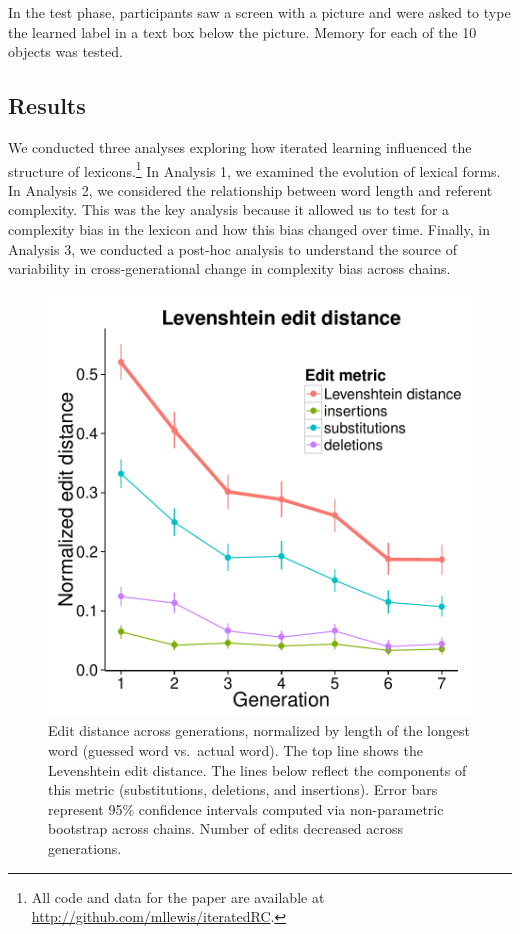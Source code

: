 In the test phase, participants saw a screen with a picture and were asked to type the learned label in a text box below the picture. Memory for each of the 10 objects was tested.

\subsection{Results}



We conducted three analyses exploring how iterated learning influenced the structure of lexicons.\footnote{All code and data for the paper are available at \url{http://github.com/mllewis/iteratedRC}.} In Analysis 1, we examined the evolution of lexical forms. In Analysis  2, we considered the relationship between word length and referent complexity. This was the key analysis because it allowed us to test for a complexity bias in the lexicon and how this bias changed over time. Finally, in Analysis  3, we conducted a post-hoc analysis to understand the source of variability in cross-generational change in complexity bias across chains.

\begin{figure}[t]
\begin{center}
\includegraphics[width = .7\linewidth]{figs/lev.pdf}
\end{center}
\vspace{-.5em}
\caption{Edit distance across generations, normalized by length of the longest word (guessed word vs.\ actual word). The top line shows the Levenshtein edit distance. The lines below reflect the components of this metric (substitutions, deletions, and insertions). Error bars represent 95\% confidence intervals computed via non-parametric bootstrap across chains. Number of edits decreased across generations.}
\label{fig:lev}
\vspace{-1em}
\end{figure}

